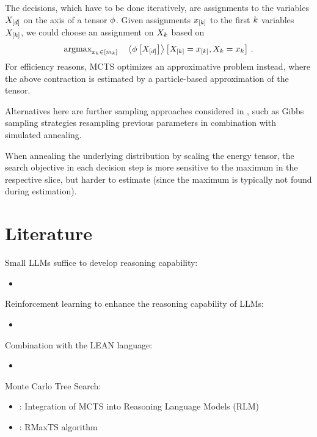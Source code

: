 \documentclass[aps,onecolumn,nofootinbib,pra]{article}
\begin{document}
The decisions, which have to be done iteratively, are assignments to the variables $X_{[d]}$ on the axis of a tensor $\phi$.
Given assignments $x_{[k]}$ to the first $k$ variables $X_{[k]}$, we could choose an assignment on $X_{k}$ based on 
\begin{align*}
	\mathrm{argmax}_{x_{k}\in[m_{k}]} \quad \left\langle \phi\left[X_{[d]}\right]\right\rangle \left[ X_{[k]}=x_{[k]},X_{k}=x_{k} \right] \, .
 \end{align*}
 For efficiency reasons, MCTS optimizes an approximative problem instead, where the above contraction is estimated by a particle-based approximation of the tensor.

Alternatives here are further sampling approaches considered in \tnreason, such as Gibbs sampling strategies resampling previous parameters in combination with simulated annealing.

When annealing the underlying distribution by scaling the energy tensor, the search objective in each decision step is more sensitive to the maximum in the respective slice, but harder to estimate (since the maximum is typically not found during estimation).

\section{Literature}

Small LLMs suffice to develop reasoning capability:
\begin{itemize}
	\item \cite{guan_rstar-math_2025}
\end{itemize}

Reinforcement learning to enhance the reasoning capability of LLMs:
\begin{itemize}
	\item \cite{deepseek-ai_deepseek-r1_2025}
\end{itemize}

Combination with the LEAN language:
\begin{itemize}
	\item \cite{xin_deepseek-prover-v15_2024}
\end{itemize}

Monte Carlo Tree Search:
\begin{itemize}
	\item \cite{besta_reasoning_2025}: Integration of MCTS into Reasoning Language Models (RLM)
	\item \cite{xin_deepseek-prover-v15_2024}: RMaxTS algorithm
\end{itemize}




\end{document}
